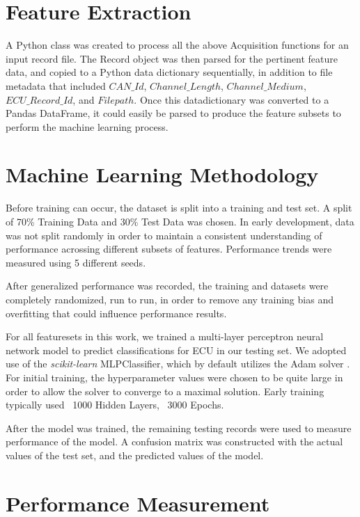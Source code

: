 \documentclass[conference]{IEEEtran}
\begin{document}
\section{Feature Extraction}
A Python class was created to process all the above Acquisition functions for an input record file. The Record object was then parsed for the pertinent feature data, and copied to a Python data dictionary sequentially, in addition to file metadata that included $CAN\_Id$, $Channel\_Length$, $Channel\_Medium$, $ECU\_Record\_Id$, and $Filepath$.
Once this datadictionary was converted to a Pandas DataFrame, it could easily be parsed to produce the feature subsets to perform the machine learning process.



\section{Machine Learning Methodology}
Before training can occur, the dataset is split into a training and test set. A split of 70\% Training Data and 30\% Test Data was chosen. In early development, data was not split randomly in order to maintain a consistent understanding of performance acrossing different subsets of features. Performance trends were measured using 5 different seeds.

After generalized performance was recorded, the training and datasets were completely randomized, run to run, in order to remove any training bias and overfitting that could influence performance results.

For all featuresets in this work, we trained a multi-layer perceptron neural network model to predict classifications for ECU in our testing set. We adopted use of the \textit{scikit-learn} MLPClassifier, which by default utilizes the Adam solver \cite{kingma2017adam}. For initial training, the hyperparameter values were chosen to be quite large in order to allow the solver to converge to a maximal solution. Early training typically used ~1000 Hidden Layers, ~3000 Epochs.

After the model was trained, the remaining testing records were used to measure performance of the model. A confusion matrix was constructed with the actual values of the test set, and the predicted values of the model.



\section{Performance Measurement}
\end{document}
